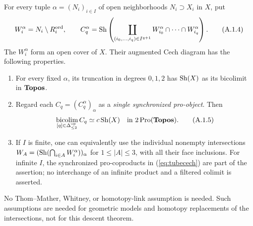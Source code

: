 \begin{result}\label{A1.2}
For every tuple $\alpha=(N_i)_{i\in I}$ of open neighborhoods $N_i\supset X_i$
in $X$, put
\[
 W_i^\alpha=N_i\setminus R_i^{\mathrm{ord}},\qquad
 C_q^\alpha=\operatorname{Sh}\left(\coprod_{(i_0,\ldots,i_q)\in I^{q+1}}
              W_{i_0}^\alpha\cap\cdots\cap W_{i_q}^\alpha\right).
\tag{A.1.4}\label{eq:tubecech}
\]
The $W_i^\alpha$ form an open cover of $X$. Their augmented Cech diagram
has the following properties.
\begin{enumerate}
\item For every fixed $\alpha$, its truncation in degrees $0,1,2$ has
      $\operatorname{Sh}(X)$ as its bicolimit in $\mathbf{Topos}$.
\item Regard each $C_q=(C_q^\alpha)_\alpha$ as a \emph{single synchronized
      pro-object}. Then
      \[
        \mathop{\mathrm{bicolim}}_{[q]\in\Delta_{\leq2}^{\mathrm{op}}}C_q
        \simeq c\operatorname{Sh}(X)
        \quad\text{in }2\operatorname{Pro}(\mathbf{Topos}).
      \tag{A.1.5}\label{eq:procech}
      \]
\item If $I$ is finite, one can equivalently use the individual nonempty
      intersections $W_A=(\operatorname{Sh}(\bigcap_{i\in A}W_i^\alpha))_\alpha$ for
      $1\leq |A|\leq3$, with all their face inclusions. For infinite $I$,
      the synchronized pro-coproducts in (\ref{eq:tubecech}) are part of the
      assertion; no interchange of an infinite product and a filtered
      colimit is asserted.
\end{enumerate}
No Thom--Mather, Whitney, or homotopy-link assumption is needed. Such
assumptions are needed for geometric models and homotopy replacements of
the intersections, not for this descent theorem.
\end{result}
